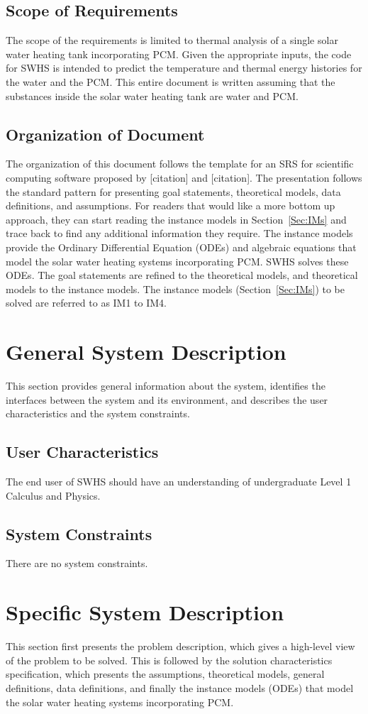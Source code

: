 \documentclass[12pt]{article}
\begin{document}
\subsection{Scope of Requirements}
\label{Sec:SoR}
The scope of the requirements is limited to thermal analysis of a single solar water heating tank incorporating PCM. Given the appropriate inputs, the code for SWHS is intended to predict the temperature and thermal energy histories for the water and the PCM. This entire document is written assuming that the substances inside the solar water heating tank are water and PCM.
\subsection{Organization of Document}
\label{Sec:OoD}
The organization of this document follows the template for an SRS for scientific computing software proposed by [citation] and [citation]. The presentation follows the standard pattern for presenting goal statements, theoretical models, data definitions, and assumptions. For readers that would like a more bottom up approach, they can start reading the instance models in Section~\ref{Sec:IMs} and trace back to find any additional information they require. The instance models provide the Ordinary Differential Equation (ODEs) and algebraic equations that model the solar water heating systems incorporating PCM. SWHS solves these ODEs.
The goal statements are refined to the theoretical models, and theoretical models to the instance models. The instance models (Section~\ref{Sec:IMs}) to be solved are referred to as IM1 to IM4.
\section{General System Description}
\label{Sec:GSD}
This section provides general information about the system, identifies the interfaces between the system and its environment, and describes the user characteristics and the system constraints.
\subsection{User Characteristics}
\label{Sec:UC}
The end user of SWHS should have an understanding of undergraduate Level 1 Calculus and Physics.
\subsection{System Constraints}
\label{Sec:SC}
There are no system constraints.
\section{Specific System Description}
\label{Sec:SSD}
This section first presents the problem description, which gives a high-level view of the problem to be solved. This is followed by the solution characteristics specification, which presents the assumptions, theoretical models, general definitions, data definitions, and finally the instance models (ODEs) that model the solar water heating systems incorporating PCM.
\end{document}
